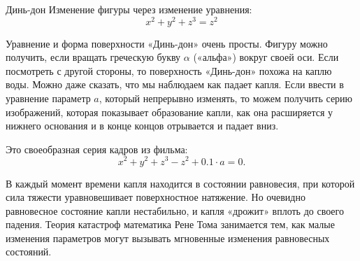 \begin{surferPage}{Динь-дон}
Изменение фигуры через изменение уравнения:\\

\smallskip
\[x^2	+ y^2	+ z^3	= z^2\]

\singlespacing
Уравнение и форма поверхности «Динь-дон» очень просты. Фигуру можно получить, если вращать греческую букву $\alpha$ («альфа») вокруг своей оси. Если посмотреть с другой стороны, то поверхность «Динь-дон» похожа на каплю воды. Можно даже сказать, что мы наблюдаем как падает капля.
\newline
Если ввести в уравнение параметр $a$, который непрерывно изменять, то можем получить серию изображений, которая показывает образование капли, как она расширяется у нижнего основания и в конце концов отрывается и падает вниз. 

Это своеобразная серия кадров из фильма:
\smallskip\smallskip\smallskip\smallskip
\[x^2	+ y^2	+ z^3	-z^2+0.1\cdot a=0.\]

В каждый момент времени капля находится в состоянии равновесия, при которой сила тяжести уравновешивает поверхностное натяжение. Но очевидно равновесное состояние капли нестабильно, и капля «дрожит» вплоть до своего падения. Теория катастроф математика Рене Тома занимается тем, как малые изменения параметров могут вызывать мгновенные изменения равновесных состояний.
\end{surferPage}
